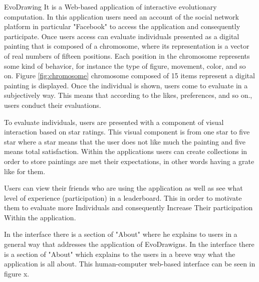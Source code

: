 EvoDrawing It is a Web-based application of interactive evolutionary computation. In this application users need an account of the social network platform in particular "Facebook" to access the application and consequently participate. Once users access can evaluate individuals presented as a digital painting that is composed of a chromosome, where its representation is a vector of real numbers of fifteen positions. Each position in the  chromosome  represents some kind of behavior, for instance  the type of figure, movement, color, and so on. Figure \ref{fig:chromosome} chromosome composed of 15 items represent a digital painting is displayed. Once the individual is shown, users come to evaluate in a subjectively way. This means that according to the likes, preferences, and so on., users conduct their evaluations. 

To evaluate individuals, users are presented with a component of visual interaction based on star ratings. This visual component is from one star to five star where  a star means that the user does not like much the painting and five means total satisfaction. Within the applications users can create collections in order to store paintings are met their expectations, in other words having a grate like for them. 

Users can view their friends who are using the application as well as see what level of experience (participation) in a leaderboard. This in order to motivate them to evaluate more Individuals and consequently Increase Their participation Within the application.

In the interface there is a section of "About" where he explains to users in a general way that addresses the application of EvoDrawigns. In the interface there is a section of "About" which explains to the  users in a breve way what the application is all about. This human-computer web-based interface can be seen in figure x.



